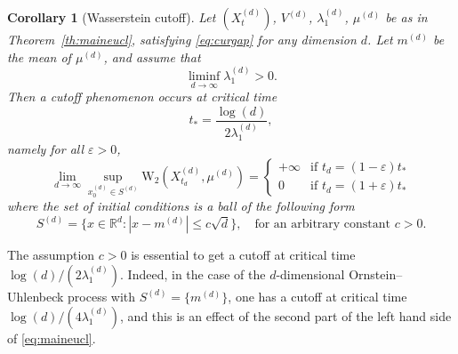 \documentclass[10pt,reqno]{amsart}
\newtheorem{corollary}[theorem]{Corollary}
\numberwithin{equation}{section}
\begin{document}
\begin{corollary}[Wasserstein cutoff] \label{cor_cutoff_langevin_general} %
  Let $(X_t^{(d)})$, $V^{(d)}$, $\lambda_1^{(d)}$, $\mu^{(d)}$ be as in
  Theorem~\ref{th:maineucl}, satisfying \eqref{eq:curgap} for any dimension
  $d$. Let $m^{(d)}$ be the mean of $\mu^{(d)}$, and assume that
  \begin{equation}
    \liminf_{d\to\infty}\lambda_1^{(d)} > 0.
  \end{equation}
  Then a cutoff phenomenon occurs at critical time
  \begin{equation}
    t_*=\frac{\log(d)}{2\lambda_1^{(d)}},
  \end{equation}
  namely for all
  $\varepsilon>0$,
  \begin{equation}
    \lim_{d\to\infty}
    \sup_{x^{(d)}_0\in S^{(d)}}
    \mathrm{W}_2(X^{(d)}_{t_d},\mu^{(d)})
    =
    \begin{cases}\label{eq:cutoff:W2}
      +\infty & \text{if $t_d=(1-\varepsilon)t_*$}\\
      0 & \text{if $t_d=(1+\varepsilon)t_*$}
    \end{cases}
  \end{equation}
  where the set of initial conditions is a ball of the following form
  \begin{equation}
    S^{(d)}=\{x\in\mathbb{R}^d:|x-m^{(d)}|\leq c\sqrt{d}\},\quad\text{for an arbitrary constant $c>0$}.
  \end{equation}
\end{corollary}

\bigskip

The assumption $c>0$ is essential to get a cutoff at critical time
$\log(d)/(2\lambda_1^{(d)})$. Indeed, in the case of the $d$-dimensional
Ornstein--Uhlenbeck process with $S^{(d)}=\{m^{(d)}\}$, one has a cutoff
at critical time $\log(d)/(4\lambda_1^{(d)})$, and this is an effect of the
second part of the left hand side of \eqref{eq:maineucl}.

\bigskip
\end{document}
